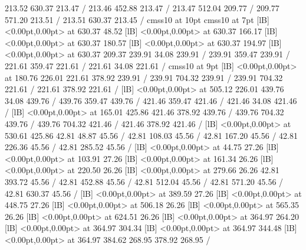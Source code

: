 { 213.52 630.37 213.47 /
\setdashpattern <4pt, 4pt>
 213.46 452.88 213.47 /
 213.47 512.04 209.77 /
 209.77 571.20 213.51 /
 213.51 630.37 213.45 /
\font\picfont cmss10 at 10pt\picfont
\font\picfont cmss10 at 7pt\picfont
{}  [lB] <0.00pt,0.00pt> at 630.37 48.52
  [lB] <0.00pt,0.00pt> at 630.37 166.17
  [lB] <0.00pt,0.00pt> at 630.37 180.57
  [lB] <0.00pt,0.00pt> at 630.37 194.97
  [lB] <0.00pt,0.00pt> at 630.37 209.37
\setsolid
{} 239.91 34.08 239.91 /
 239.91 359.47 239.91 /
 221.61 359.47 221.61 /
 221.61 34.08 221.61 /
\font\picfont cmss10 at 9pt\picfont
{}  [lB] <0.00pt,0.00pt> at 180.76 226.01
\setsolid
{} 221.61 378.92 239.91 /
 239.91 704.32 239.91 /
 239.91 704.32 221.61 /
 221.61 378.92 221.61 /
  [lB] <0.00pt,0.00pt> at 505.12 226.01
\setsolid
{} 439.76 34.08 439.76 /
 439.76 359.47 439.76 /
 421.46 359.47 421.46 /
 421.46 34.08 421.46 /
  [lB] <0.00pt,0.00pt> at 165.01 425.86
\setsolid
{} 421.46 378.92 439.76 /
 439.76 704.32 439.76 /
 439.76 704.32 421.46 /
 421.46 378.92 421.46 /
  [lB] <0.00pt,0.00pt> at 530.61 425.86
\setsolid
{} 42.81 48.87 45.56 /
\setsolid
{} 42.81 108.03 45.56 /
\setsolid
{} 42.81 167.20 45.56 /
\setsolid
{} 42.81 226.36 45.56 /
\setsolid
{} 42.81 285.52 45.56 /
  [lB] <0.00pt,0.00pt> at 44.75 27.26
  [lB] <0.00pt,0.00pt> at 103.91 27.26
  [lB] <0.00pt,0.00pt> at 161.34 26.26
  [lB] <0.00pt,0.00pt> at 220.50 26.26
  [lB] <0.00pt,0.00pt> at 279.66 26.26
\setsolid
{} 42.81 393.72 45.56 /
\setsolid
{} 42.81 452.88 45.56 /
\setsolid
{} 42.81 512.04 45.56 /
\setsolid
{} 42.81 571.20 45.56 /
\setsolid
{} 42.81 630.37 45.56 /
  [lB] <0.00pt,0.00pt> at 389.59 27.26
  [lB] <0.00pt,0.00pt> at 448.75 27.26
  [lB] <0.00pt,0.00pt> at 506.18 26.26
  [lB] <0.00pt,0.00pt> at 565.35 26.26
  [lB] <0.00pt,0.00pt> at 624.51 26.26
  [lB] <0.00pt,0.00pt> at 364.97 264.20
  [lB] <0.00pt,0.00pt> at 364.97 304.34
  [lB] <0.00pt,0.00pt> at 364.97 344.48
  [lB] <0.00pt,0.00pt> at 364.97 384.62
\setsolid
{} 268.95 378.92 268.95 /
}
